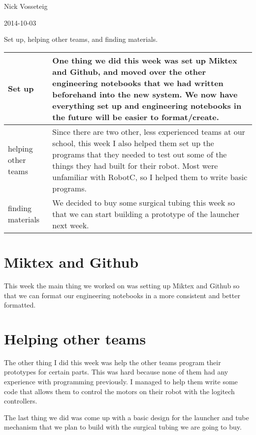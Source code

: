 Nick Vosseteig

2014-10-03

Set up, helping other teams, and finding materials.

\begin{tabular}{|p{5cm}|p{5cm}|}
 \hline
 Set up&
One thing we did this week was set up Miktex and Github, and moved over the other engineering notebooks that we had written beforehand into the new system. We now have everything set up and engineering notebooks in the future will be easier to format/create.
 \\
 \hline
helping other teams&
Since there are two other, less experienced teams at our school, this week I also helped them set up the programs that they needed to test out some of the things they had built for their robot. Most were unfamiliar with RobotC, so I helped them to write basic programs.
 \\
 \hline
 finding materials&
We decided to buy some surgical tubing this week so that we can start building a prototype of the launcher next week.
 \\
 \hline
\end{tabular}

\section*{Miktex and Github}
This week the main thing we worked on was setting up Miktex and Github so that we can format our engineering notebooks in a more consistent and better formatted.

\section*{Helping other teams}
The other thing I did this week was help the other teams program their prototypes for certain parts. This was hard because none of them had any experience with programming previously. I managed to help them write some code that allows them to control the motors on their robot with the logitech controllers.

The last thing we did was come up with a basic design for the launcher and tube mechanism that we plan to build with the surgical tubing we are going to buy.

